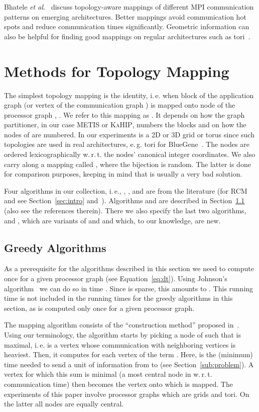 \documentclass[pdftex]{llncs}
\newcommand{\eg}{e.\,g.\xspace}
\newcommand{\ie}{i.\,e.\xspace}
\newcommand{\etal}{\textit{et al.}\xspace}
\newcommand{\wrt}{w.\,r.\,t.\xspace}
\newcommand{\metis}{\textsc{METIS}\xspace}
\newcommand{\kahip}{\textsc{KaHIP}\xspace}
\newcommand{\rcm}{\textsc{RCM}\xspace}
\begin{document}
Bhatele \etal~\cite{Bhatele:2011:AHT:2063384.2063486} discuss topology-aware
mappings of different MPI communication patterns on
emerging architectures. Better mappings avoid communication hot spots
and reduce communication times significantly. Geometric information
can also be helpful for finding good mappings on regular architectures
such as tori~\cite{6063073}.


\section{Methods for Topology Mapping}
\label{sec:algo}
The simplest topology mapping is the identity, \ie when block  of
the application graph (or vertex  of the communication graph )
is mapped onto node  of the processor graph , . We refer to this mapping as . It depends on how the
graph partitioner, in our case \metis or \kahip, numbers the blocks
and on how the nodes of  are numbered. In our experiments 
is a 2D or 3D grid or torus since such topologies are used in real architectures,
\eg tori for BlueGene~\cite{BlueGene02overview}.
The nodes are ordered
lexicographically \wrt the nodes' canonical integer coordinates. We
also carry along a mapping called , where the bijection  is random. The latter is done
for comparison purposes, keeping in mind that  is usually a
very bad solution.

Four algorithms in our collection, \ie, , ,
 and  are from the literature (for \rcm and
 see Section~\ref{sec:intro}
and~\cite{Cuthill69a,hoefler-topomap}). Algorithms 
and  are described in Section~\ref{subsec:greedy} 
(also see the references therein). There we also specify the last two
algorithms,  and , which are variants of
 and  and which, to our knowledge, are new.

\subsection{Greedy Algorithms}
\label{subsec:greedy}
As a prerequisite for the algorithms described in this section we need
to compute  once for a given processor graph 
(see Equation~\ref{eq:dt}). Using Johnson's
algorithm~\cite{Johnson77a,Cormen2001a} we can do so in time
  . Since  is sparse, this amounts to . This running time is not included in the running times
for the greedy algorithms in this section, as  is
computed only once for a given processor graph.

The mapping algorithm  consists of the ``construction
method'' proposed in~\cite{Brandfass2013372}. Using our terminology,
the algorithm starts by picking a node  of  such that
 is maximal, \ie 
is a vertex whose communication with neighboring vertices is
heaviest. Then, it computes for each vertex  of  the term
. Here,  is the (minimum)
time needed to send a unit of information from  to  (see
Section~\ref{sub:problem}). A vertex  for which this sum is
minimal (a most central node in  \wrt communication time) then
becomes the vertex onto which  is mapped. The experiments of
this paper involve processor graphs which are grids and tori. On the
latter all nodes are equally central.
\end{document}
